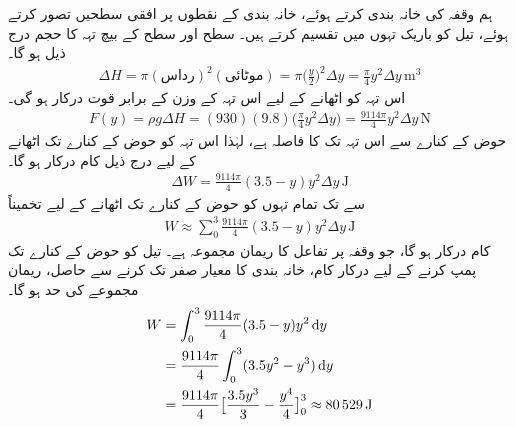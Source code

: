 ہم وقفہ  کی خانہ بندی کرتے ہوئے، خانہ بندی کے نقطوں پر افقی سطحیں تصور کرتے ہوئے، تیل کو باریک تہوں میں تقسیم کرتے ہیں۔ سطح  اور سطح  کے بیچ تہہ کا حجم درج ذیل ہو گا۔
\begin{align*}
\Delta H=\pi(\text{رداس})^2(\text{موٹائی})=\pi\big(\frac{y}{2}\big)^2\Delta y=\frac{\pi}{4}y^2\Delta y\,\si{\meter\cubed}
\end{align*}
اس تہہ کو اٹھانے کے لیے اس تہہ کے  وزن کے برابر قوت  درکار ہو گی۔
\begin{align*}
F(y)=\rho g \Delta H=(930)(9.8)\big(\frac{\pi}{4}y^2\Delta y\big)=\frac{9114\pi}{4}y^2\Delta y\,\si{\newton}
\end{align*}
حوض کے کنارے سے اس تہہ تک کا فاصلہ  ہے، لہٰذا اس تہہ کو حوض کے کنارے تک اٹھانے کے لیے درج ذیل کام درکار ہو گا۔
\begin{align*}
\Delta W=\frac{9114\pi}{4}(3.5-y)y^2\Delta y\,\si{\joule}
\end{align*}
 سے  تک تمام تہوں کو حوض کے کنارے تک اٹھانے کے لیے تخمیناً
\begin{align*}
W\approx\sum_0^{3}\frac{9114\pi}{4}(3.5-y)y^2\Delta y\,\si{\joule}
\end{align*}
کام درکار ہو گا، جو وقفہ  پر تفاعل  کا ریمان مجموعہ ہے۔ تیل کو حوض کے کنارے تک پمپ کرنے کے لیے درکار کام، خانہ بندی کا معیار صفر تک کرنے سے حاصل، ریمان مجموعے کی حد ہو گا۔
\begin{align*}
W&=\int_0^{3}\frac{9114\pi}{4}(3.5-y)y^2\dif y\\
&=\frac{9114\pi}{4}\int_0^{3}(3.5y^2-y^3)\dif y\\
&=\frac{9114\pi}{4}\big[\frac{3.5y^3}{3}-\frac{y^4}{4}\big]_0^3\approx \SI{80529}{\joule}
\end{align*}



